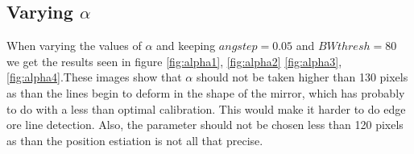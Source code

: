 \documentclass[a4paper, 20pt]{article}
\begin{document}
\begin{figure}[!ht]
\centering
\begin{floatrow}
\end{floatrow}
\end{figure}

\FloatBarrier
\subsection{Varying $\alpha$}
When varying the values of $\alpha$ and keeping $angstep = 0.05$ and $BWthresh=
80$ we get the results seen in figure \ref{fig:alpha1}, \ref{fig:alpha2}
\ref{fig:alpha3}, \ref{fig:alpha4}.These images show that $\alpha$ should not be
taken higher than 130 pixels as than the lines begin to deform in the shape of
the mirror, which has probably to do with a less than optimal calibration. This
would make it harder to do edge ore line detection. Also,
the parameter should not be chosen less than 120 pixels as than the position
estiation is not all that precise.
\end{document}
